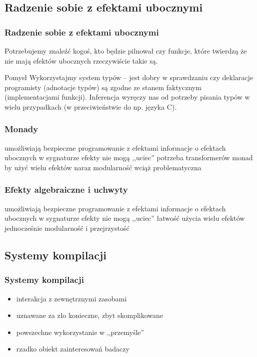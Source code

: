 \documentclass[polish, 13pt, usenames, dvipsnames]{beamer}
\begin{document}
\subsection{Radzenie sobie z efektami ubocznymi}

\begin{frame}
  \frametitle{Radzenie sobie z efektami ubocznymi}
    Potrzebujemy znaleźć kogoś, kto będzie pilnował czy funkcje, które twierdzą że nie mają efektów ubocznych rzeczywiście takie są.
  \pause
  \begin{exampleblock}{Pomysł}
    Wykorzystajmy system typów -- jest dobry w sprawdzaniu czy deklaracje programisty (adnotacje typów) są zgodne ze stanem faktycznym (implementacjami funkcji). Inferencja wyręczy nas od potrzeby pisania typów w wielu przypadkach (w przeciwieństwie do np. języka C).
  \end{exampleblock}
\end{frame}

\begin{frame}
  \frametitle{Monady}
  \begin{itemize}
  \pro umożliwiają bezpieczne programowanie z efektami
  \pro informacje o efektach ubocznych w sygnaturze
  \pro efekty nie mogą ,,uciec''
  \con potrzeba transformerów monad by użyć wielu efektów naraz
  \con modularność wciąż problematyczna
  \end{itemize}
\end{frame}

\begin{frame}
  \frametitle{Efekty algebraiczne i uchwyty}
  \begin{itemize}
    \pro umożliwiają bezpieczne programowanie z efektami
    \pro informacje o efektach ubocznych w sygnaturze
    \pro efekty nie mogą ,,uciec''
    \pro łatwość użycia wielu efektów jednocześnie
    \pro modularność i przejrzystość
  \end{itemize}
\end{frame}

\subsection{Systemy kompilacji}

\begin{frame}
  \frametitle{Systemy kompilacji}
  \begin{itemize}
  \item interakcja z zewnętrznymi zasobami
  \item uznawane za zło konieczne, zbyt skomplikowane
  \item powszechne wykorzystanie w ,,przemyśle''
  \item rzadko obiekt zainteresowań badaczy
  \end{itemize}
\end{frame}
\end{document}
